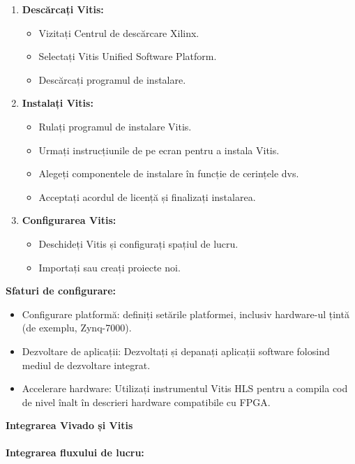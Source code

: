 \documentclass[12pt]{article}
\begin{document}
\begin{enumerate}
    \item \textbf{Descărcați Vitis:}
    \begin{itemize}
        \item Vizitați Centrul de descărcare Xilinx.
        \item Selectați Vitis Unified Software Platform.
        \item Descărcați programul de instalare.
    \end{itemize}
        \item \textbf{Instalați Vitis:}
    \begin{itemize}
        \item Rulați programul de instalare Vitis.
        \item Urmați instrucțiunile de pe ecran pentru a instala Vitis.
        \item Alegeți componentele de instalare în funcție de cerințele dvs.
        \item Acceptați acordul de licență și finalizați instalarea.
    \end{itemize}
        \item \textbf{Configurarea Vitis:}
    \begin{itemize}
        \item Deschideți Vitis și configurați spațiul de lucru.
        \item Importați sau creați proiecte noi.
    \end{itemize}
\end{enumerate}
\textbf{Sfaturi de configurare:}
\begin{itemize}
    \item Configurare platformă: definiți setările platformei, inclusiv hardware-ul țintă (de exemplu, Zynq-7000).
    \item Dezvoltare de aplicații: Dezvoltați și depanați aplicații software folosind mediul de dezvoltare integrat.
    \item Accelerare hardware: Utilizați instrumentul Vitis HLS pentru a compila cod de nivel înalt în descrieri hardware compatibile cu FPGA.
\end{itemize}
\textbf{Integrarea Vivado și Vitis}\\\\
\textbf{Integrarea fluxului de lucru:}\\
\end{document}

